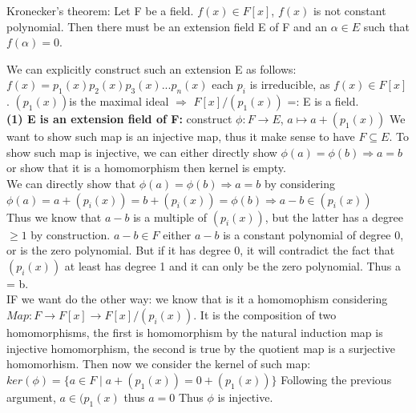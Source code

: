 \documentclass{article}
\begin{document}
\begin{theorem}
    Kronecker's theorem:
    Let F be a field. $f(x) \in F[x]$, $f(x)$ is not constant polynomial. Then there must be an extension field E of F and an $\alpha \in E$ such that $f(\alpha) = 0$.
\end{theorem}
\begin{Proof}
    We can explicitly construct such an extension E as follows:
\\ $f(x) = p_1(x)p_2(x)p_3(x)...p_n(x)$ each $p_i$ is irreducible, as $f(x)\in F[x]$. $(p_1(x))$is the maximal ideal $\Rightarrow$ $F[x]/(p_1(x))$ =: E is a field. 
\\ \textbf{(1) E is an extension field of F:} construct $\phi: F \rightarrow E$, $a \mapsto a + (p_1(x))$ We want to show such map is an injective map, thus it make sense to have $F\subseteq E$. To show such map is injective, we can either directly  show $\phi(a) = \phi(b)\Rightarrow a = b$ or show that it is a homomorphism then kernel is empty.
\\ We can directly show that $\phi(a) = \phi(b)\Rightarrow a = b$ by considering
\\$\phi(a) = a + (p_i(x)) = b + (p_i(x)) =\phi(b)\Rightarrow  a - b \in (p_i(x))$
\\ Thus we know that $a - b$ is a multiple of $(p_i(x))$, but the latter has a degree $\geq 1$ by construction. $a - b \in F$ either $a - b$ is a constant polynomial of degree 0, or is the zero polynomial. But if it has degree 0, it will contradict the fact that $(p_i(x))$ at least has degree 1 and it can only be the zero polynomial. Thus a = b.
\\IF we want do the other way: we know that is it a homomophism considering
\\$Map : F\rightarrow F[x] \rightarrow F[x]/(p_i(x))$. It is the composition of two homomorphisms, the first is homomorphism by the natural induction map is injective homomorphism, the second is true by the quotient map is a surjective homomorhism. Then now we consider the kernel of such map: $ker(\phi) = \{a \in F \mid a + (p_1(x)) = 0 + (p_1(x))\}$ Following the previous argument, $a \in (p_1(x)$ thus $a = 0$ Thus $\phi$ is injective. 
\end{Proof}
\end{document}
